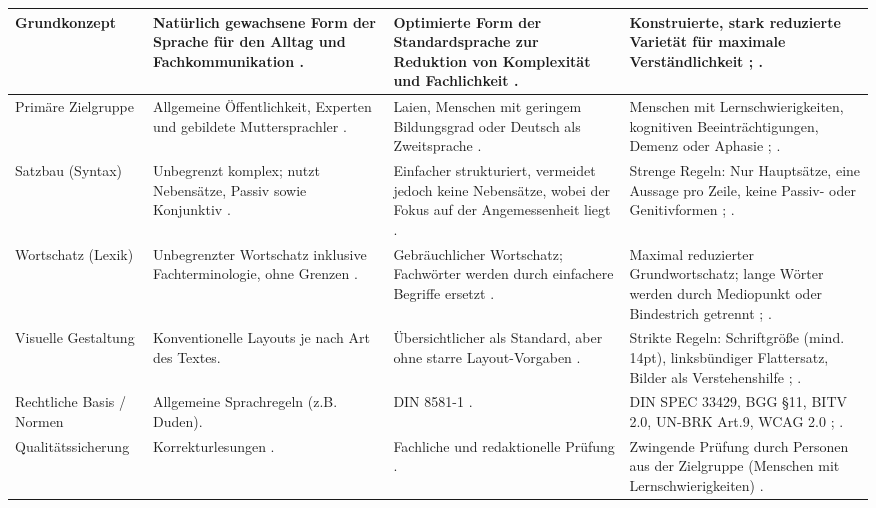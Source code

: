 \begin{longtable}{|p{}|p{}|p{}|p{}|}
	Grundkonzept & 
	Natürlich gewachsene Form der Sprache für den Alltag und Fachkommunikation \cite[S. 251]{maas_handbuch_2018}. &
	Optimierte Form der Standardsprache zur Reduktion von Komplexität und Fachlichkeit \cite{DINSPEC334292019}. &
	Konstruierte, stark reduzierte Varietät für maximale Verständlichkeit \cite{DINSPEC334292019}; \cite[S. 273-277]{maas_handbuch_2018}.\\
	\hline
	Primäre Zielgruppe & 
	Allgemeine Öffentlichkeit, Experten und gebildete Muttersprachler \cite[S. 251]{maas_handbuch_2018}. &
	Laien, Menschen mit geringem Bildungsgrad oder Deutsch als Zweitsprache \cite{DINSPEC334292019}. &
	Menschen mit Lernschwierigkeiten, kognitiven Beeinträchtigungen, Demenz oder Aphasie \cite{DINSPEC334292019}; \cite[S. 37-38]{maas_handbuch_2018}.\\
	\hline
	Satzbau (Syntax) & 
	Unbegrenzt komplex; nutzt Nebensätze, Passiv sowie Konjunktiv \cite[S. 251]{maas_handbuch_2018}. &
	Einfacher strukturiert, vermeidet jedoch keine Nebensätze, wobei der Fokus auf der Angemessenheit liegt \cite{DINSPEC334292019}. &
	Strenge Regeln: Nur Hauptsätze, eine Aussage pro Zeile, keine Passiv- oder Genitivformen \cite{DINSPEC334292019}; \cite[S. 253, 273-277]{maas_handbuch_2018}.\\
	\hline
	Wortschatz (Lexik) & 
	Unbegrenzter Wortschatz inklusive Fachterminologie, ohne Grenzen \cite[S. 251]{maas_handbuch_2018}. &
	Gebräuchlicher Wortschatz; Fachwörter werden durch einfachere Begriffe ersetzt \cite{DINSPEC334292019}. &
	Maximal reduzierter Grundwortschatz; lange Wörter werden durch Mediopunkt oder Bindestrich getrennt \cite{DINSPEC334292019}; \cite[S. 253, 273-277]{maas_handbuch_2018}.\\
	\hline
	Visuelle Gestaltung & 
	Konventionelle Layouts je nach Art des Textes. &
	Übersichtlicher als Standard, aber ohne starre Layout-Vorgaben \cite{DINSPEC334292019}. &
	Strikte Regeln: Schriftgröße (mind. 14pt), linksbündiger Flattersatz, Bilder als Verstehenshilfe \cite{DINSPEC334292019}; \cite[S. 273-277]{maas_handbuch_2018}.\\
	\hline
	Rechtliche Basis / Normen & 
	Allgemeine Sprachregeln (z.B. Duden). &
	DIN 8581-1 \cite[S. 12]{DINSPEC334292019}. &
	DIN SPEC 33429, BGG §11, BITV 2.0, UN-BRK Art.9, WCAG 2.0 \cite{DINSPEC334292019}; \cite[S. 78-89]{maas_handbuch_2018}.\\
	\hline
	Qualitätssicherung & 
	Korrekturlesungen \cite[S. 251]{maas_handbuch_2018}. &
	Fachliche und redaktionelle Prüfung \cite{DINSPEC334292019}. &
	Zwingende Prüfung durch Personen aus der Zielgruppe (Menschen mit Lernschwierigkeiten) \cite{NetzwerkLeichteSprache2022}.\\
	\hline
\end{longtable}
\clearpage
